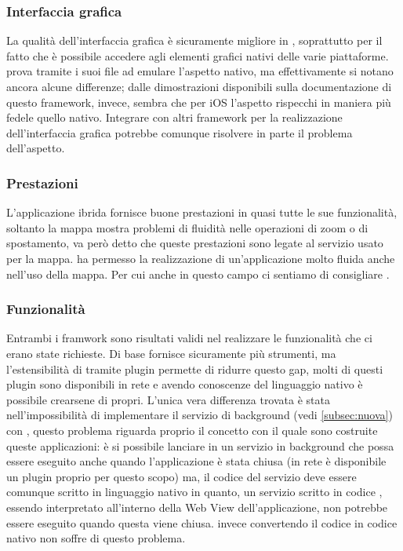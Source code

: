         \subsubsection{Interfaccia grafica}
        La qualità dell'interfaccia grafica è sicuramente migliore in \tisdk{},
        soprattutto per il fatto che è possibile accedere agli elementi
        grafici nativi delle varie piattaforme. \kendomob{} prova tramite i
        suoi file \css{} ad emulare l'aspetto nativo, ma effettivamente si
        notano ancora alcune differenze; dalle dimostrazioni disponibili sulla
        documentazione di questo framework, invece, sembra che per iOS l'aspetto
        rispecchi in maniera più fedele quello nativo. Integrare \pg{} con
        altri framework per la realizzazione dell'interfaccia grafica potrebbe
        comunque risolvere in parte il problema dell'aspetto.
        \subsubsection{Prestazioni}
        L'applicazione ibrida fornisce buone prestazioni in quasi tutte
        le sue funzionalità, soltanto la mappa mostra problemi di fluidità
        nelle operazioni di zoom o di spostamento, va però detto che queste
        prestazioni sono legate al servizio usato per la mappa.
        \tisdk{} ha permesso la realizzazione di un'applicazione molto fluida
        anche nell'uso della mappa. Per cui anche in questo campo ci sentiamo
        di consigliare \tisdk{}.
        \subsubsection{Funzionalità}
        Entrambi i framwork sono risultati validi nel realizzare le
        funzionalità che ci erano state richieste. Di base \tisdk{} fornisce
        sicuramente più strumenti, ma l'estensibilità di \pg{} tramite plugin
        permette di ridurre questo gap, molti di questi plugin sono
        disponibili in rete e avendo conoscenze del linguaggio nativo è
        possibile crearsene di propri. L'unica vera differenza
        trovata è stata nell'impossibilità di implementare il servizio di
        background (vedi \ref{subsec:nuova}) con \pg{}, questo problema
        riguarda proprio il concetto con
        il quale sono costruite queste applicazioni: è si possibile lanciare
        in \js{}
        un servizio in background che possa essere eseguito anche quando
        l'applicazione è stata chiusa (in rete è disponibile un plugin proprio
        per questo scopo) ma, il codice del servizio deve essere comunque
        scritto in linguaggio nativo in quanto, un servizio scritto in codice
        \js{}, essendo interpretato all'interno della Web View
        dell'applicazione, non potrebbe essere eseguito quando questa viene
        chiusa.
        \tisdk{} invece convertendo il codice \js{} in codice nativo non
        soffre di questo problema.
